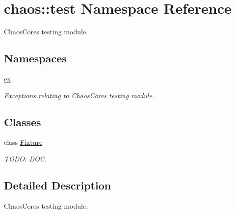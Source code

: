 \hypertarget{namespacechaos_1_1test}{}\section{chaos\+:\+:test Namespace Reference}
\label{namespacechaos_1_1test}


Chaos\+Core\textquotesingle{}s testing module.  


\subsection*{Namespaces}
\begin{DoxyCompactItemize}
\item 
 \hyperlink{namespacechaos_1_1test_1_1ex}{ex}
\begin{DoxyCompactList}\small\item\em Exceptions relating to Chaos\+Core\textquotesingle{}s testing module. \end{DoxyCompactList}\end{DoxyCompactItemize}
\subsection*{Classes}
\begin{DoxyCompactItemize}
\item 
class \hyperlink{classchaos_1_1test_1_1_fixture}{Fixture}
\begin{DoxyCompactList}\small\item\em T\+O\+D\+O\+: D\+O\+C. \end{DoxyCompactList}\end{DoxyCompactItemize}


\subsection{Detailed Description}
Chaos\+Core\textquotesingle{}s testing module. 